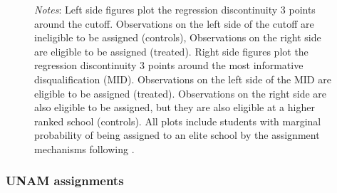 \documentclass[oneside,11pt]{article}
\begin{document}
\begin{figure}[H]
\footnotesize
\textit{Notes}: Left side figures plot the regression discontinuity 3 points around the cutoff. Observations on the left side of the cutoff are ineligible to be assigned (controls), Observations on the right side are eligible to be assigned (treated). Right side figures plot the regression discontinuity 3 points around the most informative disqualification (MID). Observations on the left side of the MID are eligible to be assigned (treated). Observations on the right side are also eligible to be assigned, but they are also eligible at a higher ranked school (controls). All plots include students with marginal probability of being assigned to an elite school by the assignment mechanisms following \citet{abdulkadirouglu2022breaking}. 
\end{figure}

\subsubsection{UNAM assignments}
\end{document}
